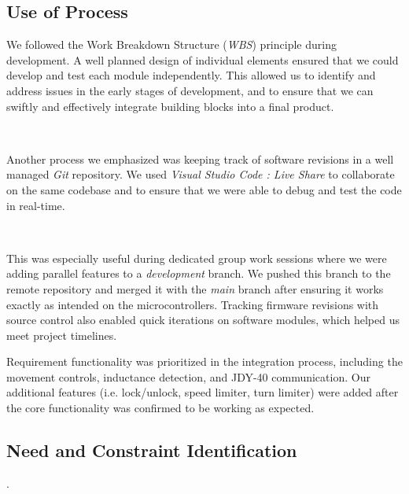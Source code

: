\documentclass{article}
\begin{document}
\subsection{Use of Process}

We followed the Work Breakdown Structure (\textit{WBS}) principle during development. A well planned design of individual elements ensured that we could
develop and test each module independently. This allowed us to identify and address issues in the early stages of development, and to
ensure that we can swiftly and effectively integrate building blocks into a final product.

\

Another process we emphasized was keeping track of software revisions in a well managed \textit{Git} repository. We used \textit{Visual Studio Code : Live Share}
to collaborate on the same codebase and to ensure that we were able to debug and test the code in real-time.

\

This was especially useful during dedicated group work sessions where we were adding parallel features to a \textit{development} branch. We pushed this branch to the remote repository
and merged it with the \textit{main} branch after ensuring it works exactly as intended on the microcontrollers. Tracking firmware revisions with source control also enabled quick iterations
on software modules, which helped us meet project timelines.

Requirement functionality was prioritized in the integration process, including the movement controls, inductance detection, and JDY-40 communication.
Our additional features (i.e. lock/unlock, speed limiter, turn limiter) were added after the core functionality was confirmed to be working as expected.

\subsection{Need and Constraint Identification}.
\end{document}
